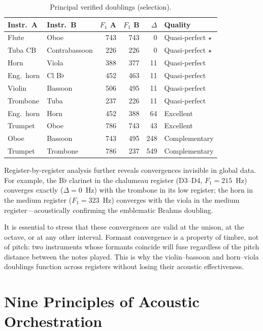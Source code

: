 \documentclass[12pt,a4paper]{article}
\begin{document}
\begin{table}[htbp]
\centering
\caption{Principal verified doublings (selection).}
\label{tab:doublings}
\begin{tabular}{llrrrl}
\toprule
Instr.~A & Instr.~B & $F_1$ A & $F_1$ B & $\Delta$ & Quality \\
\midrule
Flute & Oboe & 743 & 743 & 0 & Quasi-perfect $\star$ \\
Tuba CB & Contrabassoon & 226 & 226 & 0 & Quasi-perfect $\star$ \\
Horn & Viola & 388 & 377 & 11 & Quasi-perfect \\
Eng.\ horn & Cl B$\flat$ & 452 & 463 & 11 & Quasi-perfect \\
Violin & Bassoon & 506 & 495 & 11 & Quasi-perfect \\
Trombone & Tuba & 237 & 226 & 11 & Quasi-perfect \\
Eng.\ horn & Horn & 452 & 388 & 64 & Excellent \\
Trumpet & Oboe & 786 & 743 & 43 & Excellent \\
Oboe & Bassoon & 743 & 495 & 248 & Complementary \\
Trumpet & Trombone & 786 & 237 & 549 & Complementary \\
\bottomrule
\end{tabular}
\end{table}

Register-by-register analysis further reveals convergences invisible in global
data. For example, the B$\flat$ clarinet in the chalumeau register (D3--D4,
$F_1 = 215$~Hz) converges exactly ($\Delta = 0$~Hz) with the trombone in
its low register; the horn in the medium register ($F_1 = 323$~Hz) converges
with the viola in the medium register---acoustically confirming the emblematic
Brahms doubling.

It is essential to stress that these convergences are valid at the unison, at
the octave, or at any other interval. Formant convergence is a property of
timbre, not of pitch: two instruments whose formants coincide will fuse
regardless of the pitch distance between the notes played. This is why the
violin--bassoon and horn--viola doublings function across registers without
losing their acoustic effectiveness.

\section{Nine Principles of Acoustic Orchestration}
\label{sec:principles}
\end{document}

